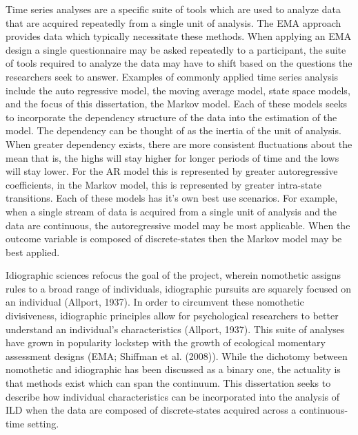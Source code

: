 \documentclass[12pt]{./styles/outhesis}
\begin{document}
Time series analyses are a specific suite of tools which are used to
analyze data that are acquired repeatedly from a single unit of
analysis. The EMA approach provides data which typically necessitate
these methods. When applying an EMA design a single questionnaire may be
asked repeatedly to a participant, the suite of tools required to
analyze the data may have to shift based on the questions the
researchers seek to answer. Examples of commonly applied time series
analysis include the auto regressive model, the moving average model,
state space models, and the focus of this dissertation, the Markov
model. Each of these models seeks to incorporate the dependency
structure of the data into the estimation of the model. The dependency
can be thought of as the inertia of the unit of analysis. When greater
dependency exists, there are more consistent fluctuations about the
mean that is, the highs will stay higher for longer periods of time and
the lows will stay lower. For the AR model this is represented by
greater autoregressive coefficients, in the Markov model, this is
represented by greater intra-state transitions. Each of these models has
it's own best use scenarios. For example, when a single stream of data
is acquired from a single unit of analysis and the data are continuous,
the autoregressive model may be most applicable. When the outcome
variable is composed of discrete-states then the Markov model may be
best applied.

Idiographic sciences refocus the goal of the project, wherein nomothetic assigns rules to a
broad range of individuals, idiographic pursuits are squarely focused on
an individual (Allport, 1937). In order to circumvent these nomothetic divisiveness, idiographic principles allow for psychological researchers to better understand an
individual's characteristics (Allport, 1937).  This suite of analyses have grown in
popularity lockstep with the growth of ecological momentary assessment
designs (EMA; Shiffman et al. (2008)). While the dichotomy between
nomothetic and idiographic has been discussed as a binary one, the
actuality is that methods exist which can span the continuum. This
dissertation seeks to describe how individual characteristics can be
incorporated into the analysis of ILD when the data are composed of
discrete-states acquired across a continuous-time setting.
\end{document}
